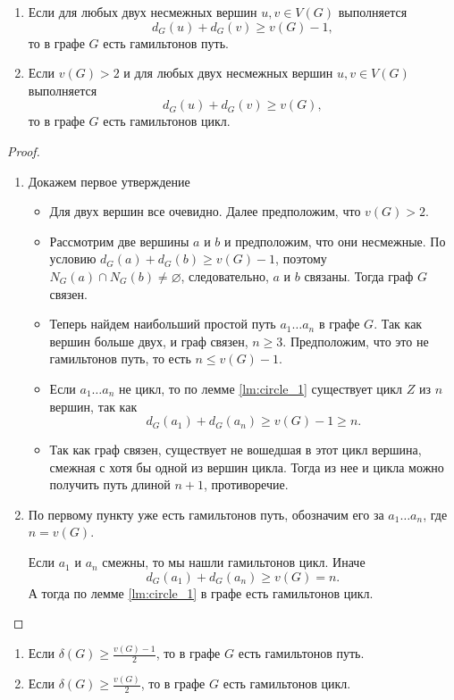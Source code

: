 \begin{theorem}
	\begin{enumerate}
		\item Если для любых двух несмежных вершин $u, v \in V(G)$ выполняется 
			\[
			d_G(u) + d_{G}(v) \ge v(G) - 1
			,\] 
			то в графе $G$ есть гамильтонов путь.
		\item Если  $v(G) > 2$ и для любых двух несмежных вершин  $u, v \in V(G)$ выполняется
			\[
			d_{G}(u) + d_{G}(v) \ge v(G)
			,\] 
			то в графе $G$ есть гамильтонов цикл.
	\end{enumerate}
\end{theorem}
\begin{proof}
\begin{enumerate}
	\item Докажем первое утверждение
	\begin{itemize}
	\item Для двух вершин все очевидно. Далее предположим, что  $v(G) > 2$.
	\item Рассмотрим две вершины $a$ и $b$ и  предположим, что они несмежные. По условию $d_G(a)+ d_{G}(b) \ge v(G) -1 $, поэтому $N_G(a) \cap N_G(b) \neq \varnothing$, следовательно, $a$ и $b$ связаны. Тогда граф $G$ связен.
	\item Теперь найдем наибольший простой путь $a_1\ldots a_{n}$ в графе $G$. Так как вершин больше двух, и граф связен, $n \ge 3$. Предположим, что это не гамильтонов путь, то есть $n \le v(G) - 1$.
	\item Если $a_1\ldots a_{n}$ не цикл, то по лемме \ref{lm:circle_1} существует цикл $Z$ из $n$ вершин, так как 
		\[
		d_G(a_1) + d_G(a_{n}) \ge v(G) - 1 \ge n
		.\] 
	\item Так как граф связен, существует не вошедшая в этот цикл вершина, смежная с хотя бы одной из вершин цикла. Тогда из нее и цикла можно получить путь длиной $n+1$, противоречие.
	\end{itemize}
\item По первому пункту уже есть гамильтонов путь, обозначим его за $a_1\ldots a_{n}$, где $n = v(G)$.

	Если $a_1$ и $a_n$ смежны, то мы нашли гамильтонов цикл. Иначе
	\[
	d_G(a_1) + d_G(a_{n}) \ge v(G) = n
	.\] 
	А тогда по лемме \ref{lm:circle_1} в графе есть гамильтонов цикл.
\end{enumerate}    
\end{proof}
\begin{corollary}
	\begin{enumerate}
		\item Если $\delta(G) \ge \frac{v(G)-1}{2}$, то в графе $G$ есть гамильтонов путь.
		\item  Если $\delta(G) \ge \frac{v(G)}{2}$, то в графе $G$ есть гамильтонов цикл.
	\end{enumerate}
\end{corollary}

